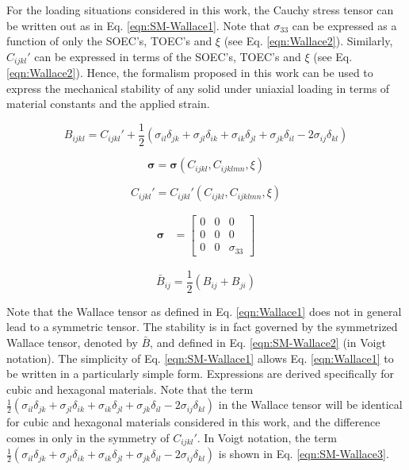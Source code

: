 \documentclass[showpacs,aps,floatfix,prb,reprint,superscriptaddress,onecolumn]{revtex4-1}
\begin{document}
\begin{enumerate}
For the loading situations considered in this work, the Cauchy stress tensor can be written out as in Eq. \ref{eqn:SM-Wallace1}. Note that $\sigma_{33}$ can be expressed as a function of only the SOEC's, TOEC's and $\xi$ (see Eq. \ref{eqn:Wallace2}). Similarly, $C_{ijkl}'$ can be expressed in terms of the SOEC's, TOEC's and $\xi$ (see Eq. \ref{eqn:Wallace2}). Hence, the formalism proposed in this work can be used to express the mechanical stability of any solid under uniaxial loading in terms of material constants and the applied strain. 

\begin{equation}
\label{eqn:Wallace1}
B_{ijkl} = C_{ijkl}' + \frac{1}{2} \left(\sigma_{il} \delta_{jk} + \sigma_{jl} \delta_{ik} + \sigma_{ik} \delta_{jl} + \sigma_{jk} \delta_{il} - 2\sigma_{ij} \delta_{kl} \right)
\end{equation}

\begin{equation}
\label{eqn:Wallace2}
\bm{\sigma} = \bm{\sigma} \left(C_{ijkl}, C_{ijklmn}, \xi \right)
\end{equation}

\begin{equation}
\label{eqn:Wallace3}
C_{ijkl}' = C_{ijkl}' \left(C_{ijkl}, C_{ijklmn}, \xi \right)
\end{equation}

\begin{equation}
\label{eqn:SM-Wallace1}
  \begin{aligned}
        \bm{\sigma}&=\begin{bmatrix} 0 & 0 & 0 \\ 0 & 0 & 0 \\ 0 & 0 & \sigma_{33} \end{bmatrix}
       \end{aligned}
\end{equation} 

\begin{equation}
\label{eqn:SM-Wallace2}
\bar{B}_{ij} = \frac{1}{2} \left(B_{ij} + B_{ji} \right)
\end{equation}


Note that the Wallace tensor as defined in Eq. \ref{eqn:Wallace1} does not in general lead to a symmetric tensor. The stability is in fact governed by the symmetrized Wallace tensor, denoted by $\bar{B}$, and defined in Eq. \ref{eqn:SM-Wallace2} (in Voigt notation). The simplicity of Eq. \ref{eqn:SM-Wallace1} allows Eq. \ref{eqn:Wallace1} to be written in a particularly simple form. Expressions are derived specifically for cubic and hexagonal materials. Note that the term $\frac{1}{2} \left(\sigma_{il} \delta_{jk} + \sigma_{jl} \delta_{ik} + \sigma_{ik} \delta_{jl} + \sigma_{jk} \delta_{il} - 2\sigma_{ij} \delta_{kl} \right)$ in the Wallace tensor will be identical for cubic and hexagonal materials considered in this work, and the difference comes in only in the symmetry of $C_{ijkl}'$. In Voigt notation, the term $\frac{1}{2} \left(\sigma_{il} \delta_{jk} + \sigma_{jl} \delta_{ik} + \sigma_{ik} \delta_{jl} + \sigma_{jk} \delta_{il} - 2\sigma_{ij} \delta_{kl} \right)$ is shown in Eq. \ref{eqn:SM-Wallace3}.


\end{enumerate}
\end{document}
